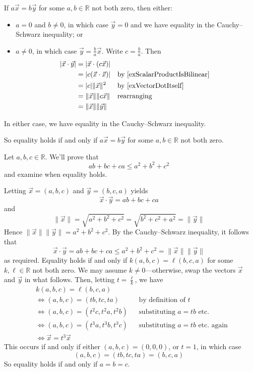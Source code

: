 \begin{cproof}
\begin{itemize}
If $a \vec x = b \vec y$ for some $a,b \in \mathbb{R}$ not both zero, then either:
\begin{itemize}
\item $a=0$ and $b \ne 0$, in which case $\vec y = 0$ and we have equality in the Cauchy--Schwarz inequality; or
\item $a \ne 0$, in which case $\vec y = \frac{b}{a} \vec x$. Write $c=\frac{b}{a}$. Then
\begin{align*}
|\vec x \cdot \vec y| &= | \vec x \cdot (c \vec x) | && \\
&= |c(\vec x \cdot \vec x)| && \text{by \Cref{exScalarProductIsBilinear}} \\
&= |c| \lVert \vec x \rVert^2 && \text{by \Cref{exVectorDotItself}} \\
&= \lVert \vec x \rVert \lVert c \vec x \rVert && \text{rearranging} \\
&= \lVert \vec x \rVert \lVert \vec y \rVert &&
\end{align*}
\end{itemize}
In either case, we have equality in the Cauchy--Schwarz inequality.
\end{itemize}

So equality holds if and only if $a \vec x = b \vec y$ for some $a,b \in \mathbb{R}$ not both zero.
\end{cproof}

\begin{example}
Let $a,b,c \in \mathbb{R}$. We'll prove that
\[ ab+bc+ca \le a^2+b^2+c^2 \]
and examine when equality holds.

Letting $\vec x = (a,b,c)$ and $\vec y = (b,c,a)$ yields
\[ \vec x \cdot \vec y = ab+bc+ca \]
and
\[ \lVert \vec x \rVert = \sqrt{a^2+b^2+c^2} = \sqrt{b^2+c^2+a^2} = \lVert \vec y \rVert \]
Hence $\lVert \vec x \rVert \lVert \vec y \rVert = a^2+b^2+c^2$. By the Cauchy--Schwarz inequality, it follows that
\[ \vec x \cdot \vec y = ab+bc+ca \le a^2+b^2+c^2 = \lVert \vec x \rVert \lVert \vec y \rVert \]
as required. Equality holds if and only if $k(a,b,c) = \ell(b,c,a)$ for some $k,\ell \in \mathbb{R}$ not both zero. We may assume $k \ne 0$---otherwise, swap the vectors $\vec x$ and $\vec y$ in what follows. Then, letting $t=\frac{\ell}{k}$, we have
\begin{align*}
&k(a,b,c) = \ell(b,c,a) && \\
&\Leftrightarrow (a,b,c) = (tb,tc,ta) && \text{by definition of $t$} \\
&\Leftrightarrow (a,b,c) = (t^2c,t^2a,t^2b) && \text{substituting $a=tb$ etc.} \\
&\Leftrightarrow (a,b,c) = (t^3a,t^3b,t^3c) && \text{substituting $a=tb$ etc.\ again} \\
&\Leftrightarrow \vec x = t^3 \vec x
\end{align*}
This occurs if and only if either $(a,b,c)=(0,0,0)$, or $t=1$, in which case
\[ (a,b,c) = (tb,tc,ta) = (b,c,a) \]
So equality holds if and only if $a=b=c$.
\end{example}

